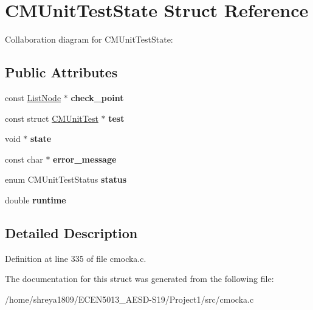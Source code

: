 \hypertarget{structCMUnitTestState}{}\section{C\+M\+Unit\+Test\+State Struct Reference}
\label{structCMUnitTestState}


Collaboration diagram for C\+M\+Unit\+Test\+State\+:
\subsection*{Public Attributes}
\begin{DoxyCompactItemize}
\item 
\mbox{\label{structCMUnitTestState_ad769ff44848de44f80c93d61a7eddb17}} 
const \hyperlink{structListNode}{List\+Node} $\ast$ {\bfseries check\+\_\+point}
\item 
\mbox{\label{structCMUnitTestState_abf83fd798716db84ada52946bf11cf4c}} 
const struct \hyperlink{structCMUnitTest}{C\+M\+Unit\+Test} $\ast$ {\bfseries test}
\item 
\mbox{\label{structCMUnitTestState_ad923f78d81da599c113295cd33a9e959}} 
void $\ast$ {\bfseries state}
\item 
\mbox{\label{structCMUnitTestState_a9649fbe018ad0be988e4e17fb42f9d7f}} 
const char $\ast$ {\bfseries error\+\_\+message}
\item 
\mbox{\label{structCMUnitTestState_a669ce36dac14c0cc9380e336382fe415}} 
enum C\+M\+Unit\+Test\+Status {\bfseries status}
\item 
\mbox{\label{structCMUnitTestState_a9e6b7af92cff16f613c0d89022bb20de}} 
double {\bfseries runtime}
\end{DoxyCompactItemize}


\subsection{Detailed Description}


Definition at line 335 of file cmocka.\+c.



The documentation for this struct was generated from the following file\+:\begin{DoxyCompactItemize}
\item 
/home/shreya1809/\+E\+C\+E\+N5013\+\_\+\+A\+E\+S\+D-\/\+S19/\+Project1/src/cmocka.\+c\end{DoxyCompactItemize}
